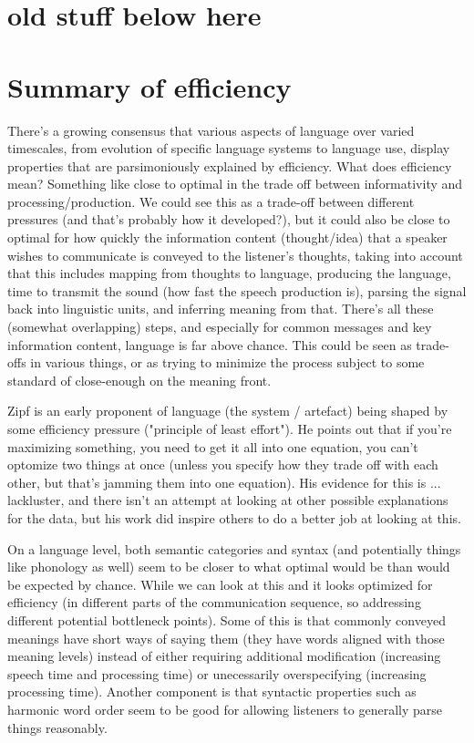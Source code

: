 \documentclass[]{article}
\begin{document}
\section{old stuff below here}


\section{Summary of efficiency}

There's a growing consensus that various aspects of language over varied timescales, from evolution of specific language systems to language use, display properties that are parsimoniously explained by efficiency. What does efficiency mean? Something like close to optimal in the trade off between informativity and processing/production. We could see this as a trade-off between different pressures (and that's probably how it developed?), but it could also be close to optimal for how quickly the information content (thought/idea) that a speaker wishes to communicate is conveyed to the listener's thoughts, taking into account that this includes mapping from thoughts to language, producing the language, time to transmit the sound (how fast the speech production is), parsing the signal back into linguistic units, and inferring meaning from that. There's all these (somewhat overlapping) steps, and especially for common messages and key information content, language is far above chance. This could be seen as trade-offs in various things, or as trying to minimize the process subject to some standard of close-enough on the meaning front. 

Zipf is an early proponent of language (the system / artefact) being shaped by some efficiency pressure ("principle of least effort"). He points out that if you're maximizing something, you need to get it all into one equation, you can't optomize two things at once (unless you specify how they trade off with each other, but that's jamming them into one equation). His evidence for this is ... lackluster, and there isn't an attempt at looking at other possible explanations for the data, but his work did inspire others to do a better job at looking at this. 

On a language level, both semantic categories and syntax (and potentially things like phonology as well) seem to be closer to what optimal would be than would be expected by chance. While we can look at this and it looks optimized for efficiency (in different parts of the communication sequence, so addressing different potential bottleneck points). Some of this is that commonly conveyed meanings have short ways of saying them (they have words aligned with those meaning levels) instead of either requiring additional modification (increasing speech time and processing time) or unecessarily overspecifying (increasing processing time). Another component is that syntactic properties such as harmonic word order seem to be good for allowing listeners to generally parse things reasonably. 
\end{document}
